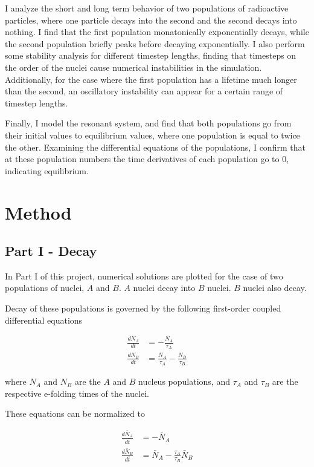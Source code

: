 \documentclass[pra,twocolumn,showpacs,amsmath,amssymb]{revtex4-1}
\begin{document}
I analyze the short and long term behavior of two populations of radioactive
particles, where one particle decays into the second and the second decays into
nothing. I find that the first population monatonically exponentially decays,
while the second population briefly peaks before decaying exponentially.
I also perform some stability analysis for different timestep lengths, finding
that timesteps on the order of the nuclei cause numerical instabilities in
the simulation. Additionally, for the case where the first population has a
lifetime much longer than the second, an oscillatory instability can appear
for a certain range of timestep lengths.

Finally, I model the resonant system, and find that both populations go
from their initial values to equilibrium values, where one population
is equal to twice the other. Examining the differential equations of the
populations, I confirm that at these population numbers the time derivatives
of each population go to 0, indicating equilibrium.


\section{Method}

\subsection{Part I - Decay}


In Part I of this project, numerical solutions are plotted for the case of two
populations of nuclei, $A$ and $B$. $A$ nuclei decay into $B$ nuclei. $B$
nuclei also decay.

Decay of these populations is governed by the following first-order coupled
differential equations

\begin{align}
  \frac{d N_A}{dt} &= -\frac{N_A}{\tau_A} \\
  \frac{d N_B}{dt} &= \frac{N_A}{\tau_A} - \frac{N_B}{\tau_B}
\end{align}

where $N_A$ and $N_B$ are the $A$ and $B$ nucleus populations, and $\tau_A$ and
$\tau_B$ are the respective e-folding times of the nuclei.

These equations can be normalized to

\begin{align}
  \frac{d \bar N_A}{d \bar t} &= - \bar N_A \label{eq:decay_A_norm}\\
  \frac{d \bar N_B}{d \bar t} &= \bar N_A - \frac{\tau_A}{\tau_B} \label{eq:decay_B_norm}\bar N_B
\end{align}
\end{document}
